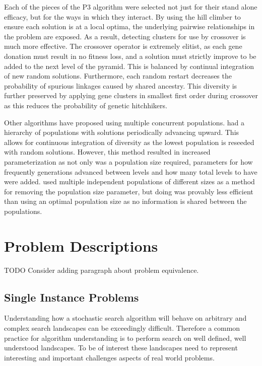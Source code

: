 \documentclass[twoside]{article}
\begin{document}
Each of the pieces of the P3 algorithm were selected not just for their stand alone efficacy,
but for the ways in which they interact. By using the hill climber to ensure each solution
is at a local optima, the underlying pairwise relationships in the problem are exposed. As
a result, detecting clusters for use by crossover is much more effective. The crossover operator
is extremely elitist, as each gene donation must result in no fitness loss, and a solution must
strictly improve to be added to the next level of the pyramid. This is balanced by continual
integration of new random solutions. Furthermore, each random restart decreases the probability
of spurious linkages caused by shared ancestry. This diversity is further preserved by applying
gene clusters in smallest first order during crossover as this reduces the probability of genetic
hitchhikers.

Other algorithms have proposed using multiple concurrent populations.
\cite{hornby:2006:alps} had a hierarchy of populations with solutions periodically advancing
upward. This allows for continuous integration of diversity as the lowest population is reseeded
with random solutions. However, this method resulted in increased parameterization as not only was
a population size required, parameters for how frequently generations advanced between levels and
how many total levels to have were added. \cite{harik:1999:parameterlessga} used multiple independent
populations of different sizes as a method for removing the population size parameter, but
doing was provably less efficient than using an optimal population size as no information is shared
between the populations.

\section{Problem Descriptions}
\label{sec-problems}
TODO Consider adding paragraph about problem equivalence.

\subsection{Single Instance Problems}
Understanding how a stochastic search algorithm will behave on arbitrary and complex
search landscapes can be exceedingly difficult. Therefore a common practice for
algorithm understanding is to perform search on well defined, well understood
landscapes. To be of interest these landscapes need to represent interesting
and important challenges aspects of real world problems.
\end{document}
